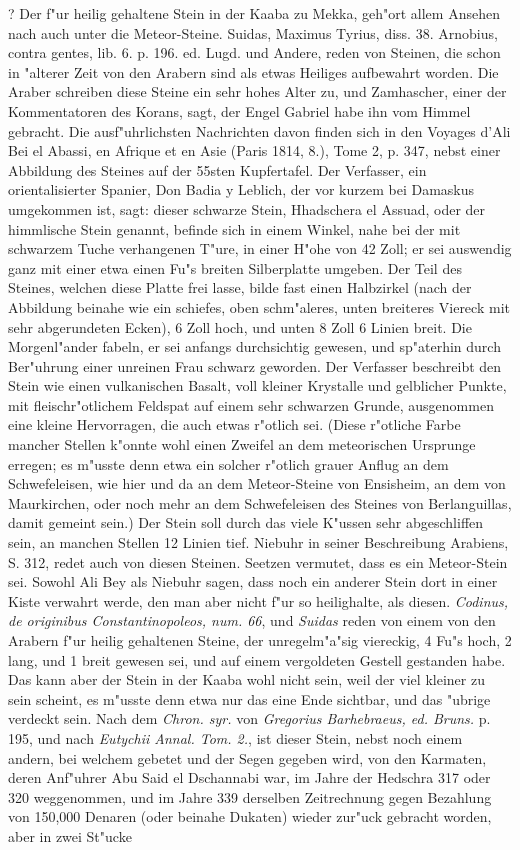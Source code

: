 \documentclass[a4paper, 11pt, oneside, polutonikogreek, german]{article}
\begin{document}
? Der f"ur heilig gehaltene Stein in der Kaaba zu Mekka, geh"ort allem Ansehen nach auch unter die Meteor-Steine. Suidas, Maximus Tyrius, diss. 38. Arnobius, contra gentes, lib. 6. p. 196. ed. Lugd. und Andere, reden von Steinen, die schon in "alterer Zeit von den Arabern sind als etwas Heiliges aufbewahrt worden. Die Araber schreiben diese Steine ein sehr hohes Alter zu, und Zamhascher, einer der Kommentatoren des Korans, sagt, der Engel Gabriel habe ihn vom Himmel gebracht. Die ausf"uhrlichsten Nachrichten davon finden sich in den Voyages d'Ali Bei el Abassi, en Afrique et en Asie (Paris 1814, 8.), Tome 2, p. 347, nebst einer Abbildung des Steines auf der 55sten Kupfertafel. Der Verfasser, ein orientalisierter Spanier, Don Badia y Leblich, der vor kurzem bei Damaskus umgekommen ist, sagt: dieser schwarze Stein, Hhadschera el Assuad, oder der himmlische Stein genannt, befinde sich in einem Winkel, nahe bei der mit schwarzem Tuche verhangenen T"ure, in einer H"ohe von 42 Zoll; er sei auswendig ganz mit einer etwa einen Fu"s breiten Silberplatte umgeben. Der Teil des Steines, welchen diese Platte frei lasse, bilde fast einen Halbzirkel (nach der Abbildung beinahe wie ein schiefes, oben schm"aleres, unten breiteres Viereck mit sehr abgerundeten Ecken), 6 Zoll hoch, und unten 8 Zoll 6 Linien breit. Die Morgenl"ander fabeln, er sei anfangs durchsichtig gewesen, und sp"aterhin durch Ber"uhrung einer unreinen Frau schwarz geworden. Der Verfasser beschreibt den Stein wie einen vulkanischen Basalt, voll kleiner Krystalle und gelblicher Punkte, mit fleischr"otlichem Feldspat auf einem sehr schwarzen Grunde, ausgenommen eine kleine Hervorragen, die auch etwas r"otlich sei. (Diese r"otliche Farbe mancher Stellen k"onnte wohl einen Zweifel an dem meteorischen Ursprunge erregen; es m"usste denn etwa ein solcher r"otlich grauer Anflug an dem Schwefeleisen, wie hier und da an dem Meteor-Steine von Ensisheim, an dem von Maurkirchen, oder noch mehr an dem Schwefeleisen des Steines von Berlanguillas, damit gemeint sein.) Der Stein soll durch das viele K"ussen sehr abgeschliffen sein, an manchen Stellen 12 Linien tief. Niebuhr in seiner Beschreibung Arabiens, S. 312, redet auch von diesen Steinen. Seetzen vermutet, dass es ein Meteor-Stein sei. Sowohl Ali Bey als Niebuhr sagen, dass noch ein anderer Stein dort in einer Kiste verwahrt werde, den man aber nicht f"ur so heilighalte, als diesen. \emph{Codinus, de originibus Constantinopoleos, num. 66}, und \emph{Suidas} reden von einem von den Arabern f"ur heilig gehaltenen Steine, der unregelm"a"sig viereckig, 4 Fu"s hoch, 2 lang, und 1 breit gewesen sei, und auf einem vergoldeten Gestell gestanden habe. Das kann aber der Stein in der Kaaba wohl nicht sein, weil der viel kleiner zu sein scheint, es m"usste denn etwa nur das eine Ende sichtbar, und das "ubrige verdeckt sein. Nach dem \emph{Chron. syr.} von \emph{Gregorius Barhebraeus, ed. Bruns.} p. 195, und nach \emph{Eutychii Annal. Tom. 2.}, ist dieser Stein, nebst noch einem andern, bei welchem gebetet und der Segen gegeben wird, von den Karmaten, deren Anf"uhrer Abu Said el Dschannabi war, im Jahre der Hedschra 317 oder 320 weggenommen, und im Jahre 339 derselben Zeitrechnung gegen Bezahlung von 150,000 Denaren (oder beinahe Dukaten) wieder zur"uck gebracht worden, aber in zwei St"ucke 
\end{document}
